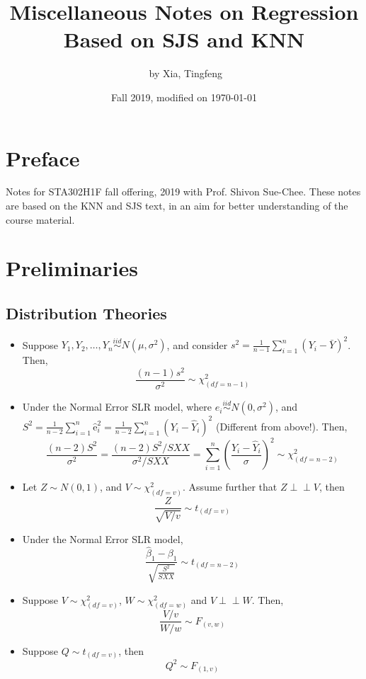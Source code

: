\documentclass[11pt]{article}
\title{\LARGE{Miscellaneous Notes on Regression}\\ \normalsize{Based on SJS and KNN}}
\author{\ccLogo \,\,by Xia, Tingfeng}
\date{Fall 2019, modified on \today}
\newcommand{\independent}{\perp \!\!\! \perp}
\begin{document}
\maketitle
\section*{Preface}
Notes for STA302H1F fall offering, 2019 with Prof. Shivon Sue-Chee. These notes are based on the KNN and SJS text, in an aim for better understanding of the course material.
\doclicenseThis
\tableofcontents
\newpage

\section{Preliminaries}
\subsection{Distribution Theories}
\begin{itemize}
    \item Suppose $Y_1, Y_2 ,\dots, Y_n \overset{iid}{\sim} N(\mu, \sigma^2)$, and consider $s^{2}=\frac{1}{n-1} \sum_{i=1}^{n}\left(Y_{i}-\bar{Y}\right)^{2}$. Then,
        \begin{equation*}
            \frac{(n-1) s^{2}}{\sigma^{2}} \sim \chi^{2}_{(d f=n-1)}
        \end{equation*}
    \item Under the Normal Error SLR model, where $e_{i} \overset{iid}{\sim} N\left(0, \sigma^{2}\right)$, and $S^{2}=\frac{1}{n-2} \sum_{i=1}^{n} \hat{\mathrm{e}}_{i}^{2}=\frac{1}{n-2} \sum_{i=1}^{n}\left(Y_{i}-\hat{Y}_{i}\right)^{2}$ (Different from above!). Then,
        \begin{equation*}
            \frac{(n-2) S^{2}}{\sigma^{2}}=\frac{(n-2) S^{2} / S X X}{\sigma^{2} / S X X}=\sum_{i=1}^{n}\left(\frac{Y_{i}-\hat{Y}_{i}}{\sigma}\right)^{2} \sim \chi^{2}_{(d f=n-2)}
        \end{equation*}
    \item Let $Z\sim N(0,1)$, and $V\sim \chi^2_{(df=v)}$. Assume further that $Z\independent V$, then
        \begin{equation*}
            \frac{Z}{\sqrt{V / v}} \sim t_{(df=v)}
        \end{equation*}
    \item Under the Normal Error SLR model,
        \begin{equation*}
            \frac{\hat{\beta}_{1}-\beta_{1}}{\sqrt{\frac{S^{2}}{S X X}}} \sim t_{(df = n-2)}
        \end{equation*}
    \item Suppose $V \sim \chi_{(df=v)}^{2}$, $W \sim \chi_{(df=w)}^2$ and $V\independent W$. Then,
        \begin{equation*}
            \frac{V / v}{W / w} \sim F_{(v, w)}
        \end{equation*}
    \item Suppose $Q\sim t_{(df=v)}$, then
        \begin{equation*}
            Q^2 \sim F_{(1,v)}
        \end{equation*}
\end{itemize}
\end{document}
